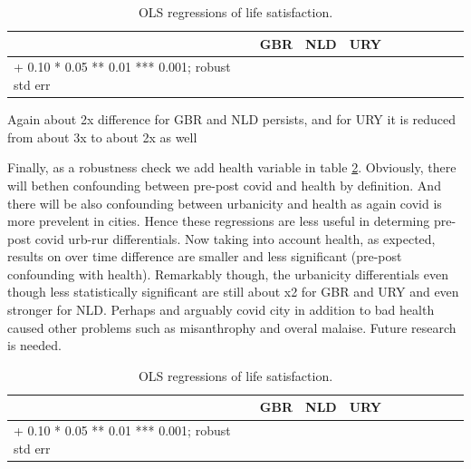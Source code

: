 \documentclass[10pt, letterpaper]{article}
\begin{document}
\begin{spacing}{1.4}
\begin{spacing}{.9} \begin{table}[H]\centering   \begin{scriptsize} \begin{tabular}{p{1.8in}p{.5in}p{.5in}|p{.5in}p{.5in}|p{.5in}p{.5in}|p{.5in}p{.5in}p{.5in}p{.5 in}p{.5in}p{.5 in}}\hline\hline&\multicolumn{2}{c}{GBR}&\multicolumn{2}{c}{NLD}&\multicolumn{2}{c}{URY}\\  \hline + 0.10 * 0.05 ** 0.01 *** 0.001; robust std err \end{tabular}\end{scriptsize}\caption{\label{b}OLS regressions of life satisfaction.}\end{table} \end{spacing}

Again about 2x difference for GBR and NLD persists, and for URY it is reduced
from about 3x to about 2x as well

Finally, as a robustness check we add health variable in table
\ref{c}. Obviously, there will bethen confounding between pre-post covid and
health by definition. 
And there will be also confounding between urbanicity and health as again covid
is more prevelent in cities.  Hence these regressions are less useful in determing pre-post
covid urb-rur differentials. Now taking into account health, as expected,
results on over time difference are smaller and less significant (pre-post
confounding with health). Remarkably though, the urbanicity differentials even
though less statistically significant are still about x2 for GBR and URY and
even stronger for NLD. Perhaps and arguably covid city in addition to bad health
caused other problems such as misanthrophy and overal malaise. Future research
is needed. 

\begin{spacing}{.9} \begin{table}[H]\centering   \begin{scriptsize} \begin{tabular}{p{1.8in}p{.5in}p{.5in}|p{.5in}p{.5in}|p{.5in}p{.5in}|p{.5in}p{.5in}p{.5in}p{.5 in}p{.5in}p{.5 in}}\hline\hline&\multicolumn{2}{c}{GBR}&\multicolumn{2}{c}{NLD}&\multicolumn{2}{c}{URY}\\  \hline + 0.10 * 0.05 ** 0.01 *** 0.001; robust std err \end{tabular}\end{scriptsize}\caption{\label{c}OLS regressions of life satisfaction.}\end{table} \end{spacing}


\end{spacing}
\end{document}
